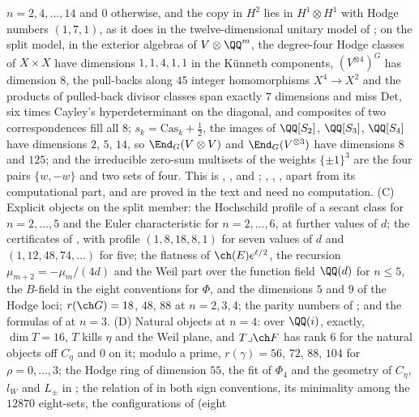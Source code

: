 \begin{enumerate}[label=\textup{(\Roman*)},leftmargin=*]
  $n=2,4,\dots,14$ and $0$ otherwise, and the copy in $H^{2}$ lies in
  $H^{1}\otimes H^{1}$ with Hodge numbers $(1,7,1)$, as it does in the
  twelve-dimensional unitary model of ; on the split
  model, in the exterior algebras of $V\otimes\QQ^{m}$, the degree-four Hodge
  classes of $X\times X$ have dimensions $1,1,4,1,1$ in the K\"unneth
  components, $(V^{\otimes4})^{G}$ has dimension $8$, the pull-backs along $45$
  integer homomorphisms $X^{4}\to X^{2}$ and the products of pulled-back
  divisor classes span exactly $7$ dimensions and miss $\mathrm{Det}$, six
  times Cayley's hyperdeterminant on the diagonal, and composites of two
  correspondences fill all $8$; $s_{k}=\mathrm{Cas}_{k}+\frac12$, the images of
  $\QQ[S_{2}]$, $\QQ[S_{3}]$, $\QQ[S_{4}]$ have dimensions $2$, $5$, $14$, so
  $\End_{G}(V\otimes V)$ and $\End_{G}(V^{\otimes3})$ have dimensions $8$ and
  $125$; and the irreducible zero-sum multisets of the weights $\{\pm1\}^{3}$
  are the four pairs $\{w,-w\}$ and two sets of four. This is
  , , 
  and ; ,
  , , apart from its
  computational part, and  are proved in the text
  and need no computation. (C) Explicit objects on the split member: the
  Hochschild profile of a secant class for $n=2,\dots,5$ and the Euler
  characteristic for $n=2,\dots,6$, at further values of $d$; the
  certificates of , with profile $(1,8,18,8,1)$ for seven values of
  $d$ and $(1,12,48,74,\dots)$ for five; the flatness of
  $\ch(E)e^{\ell/2}$, the recursion $\mu_{m+2}=-\mu_{m}/(4d)$ and the Weil
  part over the function field $\QQ(d)$ for $n\le5$, the $B$-field in the
  eight conventions for $\Phi$, and the dimensions $5$ and $9$ of the Hodge
  loci; $r(\ch G)=18$, $48$, $88$ at $n=2,3,4$; the parity numbers of
  ; and the formulas of  at $n=3$.
  (D) Natural objects at $n=4$: over $\QQ(i)$, exactly, $\dim T=16$,
  $T$ kills $\eta$ and the Weil plane, and $T\lrcorner\ch F$ has rank $6$ for
  the natural objects off $C_{\eta}$ and $0$ on it; modulo a prime,
  $r(\gamma)=56$, $72$, $88$, $104$ for $\rho=0,\dots,3$; the Hodge ring of
  dimension $55$, the fit of $\Phi_{4}$ and the geometry of $C_{\eta}$,
  $l_{W}$ and $L_{\pm}$ in ; the relation of
   in both sign conventions, its minimality among the
  $12870$ eight-sets, the configurations of  (eight

\end{enumerate}

